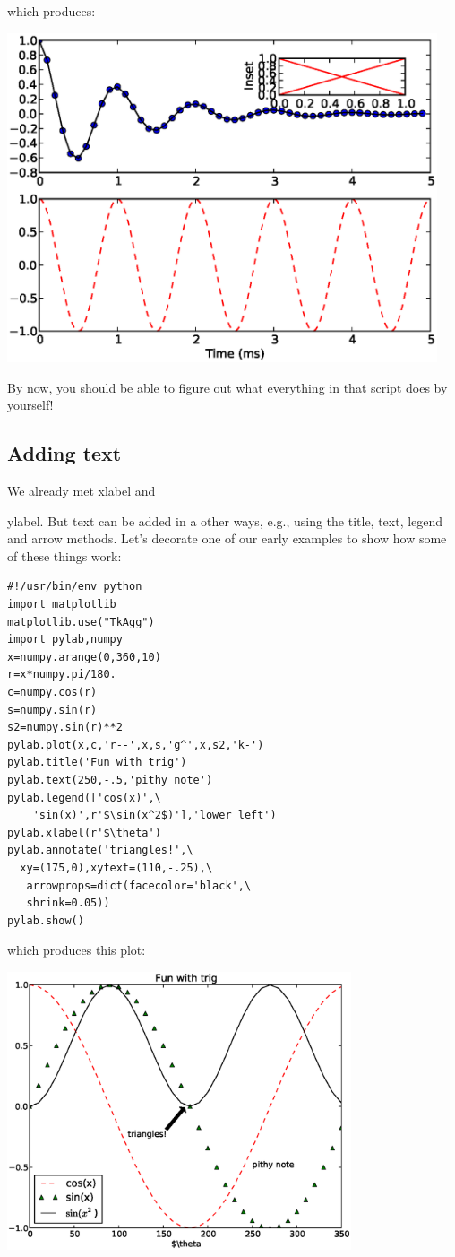 \documentclass[11pt]{book}
\begin{document}
{{\noindent which produces:

{\includegraphics[width=5in]{EPSfiles/matplotlib3.eps}}

\noindent By now, you should be able to figure out what everything in that script does by yourself!  

\subsection{Adding text}

We already met {\color{blue}xlabel} and {{\color{blue}ylabel}.  But text can be added in a other ways, e.g., using the  title, text, legend and arrow methods.
Let's decorate one of our early examples to show how some of these things work:

{ \color{blue} \begin{verbatim}
#!/usr/bin/env python
import matplotlib
matplotlib.use("TkAgg")
import pylab,numpy
x=numpy.arange(0,360,10)
r=x*numpy.pi/180.
c=numpy.cos(r)
s=numpy.sin(r)
s2=numpy.sin(r)**2
pylab.plot(x,c,'r--',x,s,'g^',x,s2,'k-')
pylab.title('Fun with trig')
pylab.text(250,-.5,'pithy note')
pylab.legend(['cos(x)',\
    'sin(x)',r'$\sin(x^2$)'],'lower left')
pylab.xlabel(r'$\theta')
pylab.annotate('triangles!',\
  xy=(175,0),xytext=(110,-.25),\
   arrowprops=dict(facecolor='black',\
   shrink=0.05))
pylab.show()
\end{verbatim}}

\noindent which produces this plot:

\includegraphics[width=4in]{EPSfiles/matplotlib4.eps}

}}}
\end{document}
